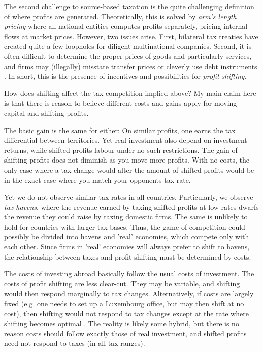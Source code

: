 \documentclass[twoside,a4paper,11pt]{article}
\begin{document}
The second challenge to source-based taxation is the quite challenging definition of where profits are generated. Theoretically, this is solved by \textit{arm's length pricing} where all national entities computes profits separately, pricing internal flows at market prices. However, two issues arise. First, bilateral tax treaties have created quite a few loopholes for diligent multinational companies. Second, it is often difficult to determine the proper prices of goods and particularly services, and firms may (illegally) misstate transfer prices or cleverly use debt instruments \autocite{zucman_taxing_2014}. In short, this is the presence of incentives and possibilities for \textit{profit shifting}. 

How does shifting affect the tax competition implied above? My main claim here is that there is reason to believe different costs and gains apply for moving capital and shifting profits.

The basic gain is the same for either: On similar profits, one earns the tax differential between territories. Yet real investment also depend on investment returns, while shifted profits labour under no such restrictions. The gain of shifting profits does not diminish as you move more profits. With no costs, the only case where a tax change would alter the amount of shifted profits would be in the exact case where you match your opponents tax rate. 

Yet we do not observe similar tax rates in all countries. Particularly, we observe \textit{tax havens}, where the revenue earned by  taxing shifted profits at low rates dwarfs the revenue they could raise by taxing domestic firms. The same is unlikely to hold for countries with larger tax bases. Thus, the game of competition could possibly be divided into havens and 'real' economies, which compete only with each other. Since firms in 'real' economies will always prefer to shift to havens,  the relationship between taxes and profit shifting must be determined by costs.  

The costs of investing abroad basically follow the usual costs of investment. The costs of profit shifting are less clear-cut. They may be variable, and shifting would then respond marginally to tax changes. Alternatively, if costs are largely fixed (e.g. one needs to set up a Luxembourg office, but may then shift at no cost), then shifting would not respond to tax changes except at the rate where shifting becomes optimal \autocite{johannesen_are_2016}. The reality is likely some hybrid, but there is no reason costs should follow exactly those of real investment, and shifted profits need not respond to taxes (in all tax ranges). 
\end{document}
